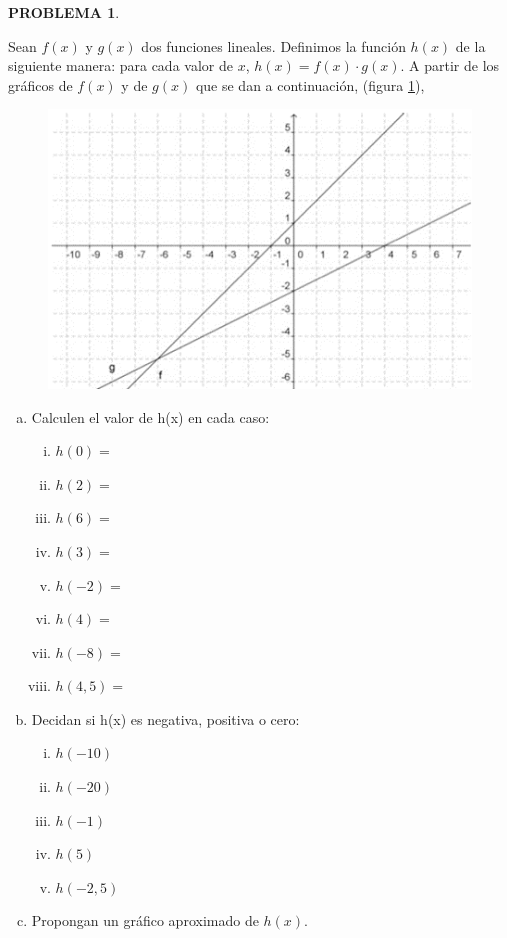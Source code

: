 \documentclass[oneside,spanish]{amsart}
\numberwithin{equation}{section}
\numberwithin{figure}{section}
\theoremstyle{definition}
\newtheorem{problema}{\normalfont PROBLEMA}
\begin{document}
\begin{problema}\label{prob:1}

Sean $f(x)$ y $g(x)$ dos funciones lineales. Definimos la función $h(x)$ de la siguiente manera: para cada valor de $x$, $h(x) = f(x) \cdot g(x)$. A partir de los gráficos de $f(x)$ y de $g(x)$ que se dan a continuación, (figura \ref{fig:imagen1}),

\begin{figure}[h]
	\centering
	\caption{}
	\label{fig:imagen1}
	\includegraphics[width=0.7\linewidth]{Anexos-03/Imagen1}
\end{figure}

\begin{enumerate}[a.]
	\item Calculen el valor de h(x) en cada caso:
	\begin{multicols}{4}
		\begin{enumerate}[i.]
			\item $h(0)=$
			\item $h(2)=$
			\item $h(6)=$
			\item $h(3)=$
			\item $h(-2)=$
			\item $h(4)=$
			\item $h(-8)=$
			\item $h(4,5)=$
		\end{enumerate}
	\end{multicols}
	
	\break
	
	\item Decidan si h(x) es negativa, positiva o cero:
	\begin{multicols}{5}
		\begin{enumerate}[i.]
			\item $h(-10)$
			\item $h(-20)$
			\item $h(-1)$
			\item $h(5)$
			\item $h(-2,5)$
		\end{enumerate}
	\end{multicols}
	
	\item Propongan un gráfico aproximado de $h(x)$.
\end{enumerate}
\end{problema}
\end{document}
